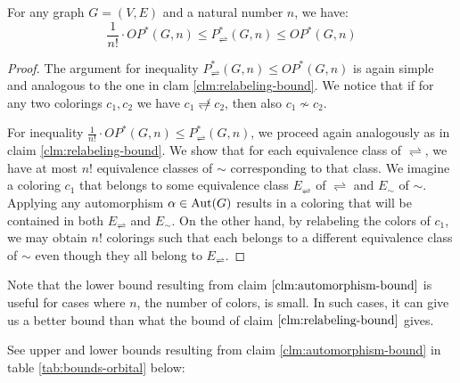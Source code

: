 \begin{claim}\label{clm:automorphism-bound}
    For any graph $G=(V,E)$ and a natural number $n$, we have: $$\frac{1}{n!} \cdot OP^*(G,n) \leq P^*_\rightleftharpoons(G,n) \leq OP^*(G,n)$$
\end{claim}

\begin{proof}

The argument for inequality $P^*_\rightleftharpoons(G,n) \leq OP^*(G,n)$ is again simple and analogous to the one in clam \ref{clm:relabeling-bound}. We notice that if for any two colorings $c_1,c_2$ we have $c_1 \not\rightleftharpoons c_2$, then also $c_1 \not\sim c_2$.

For inequality $\frac{1}{n!} \cdot OP^*(G,n) \leq P^*_\rightleftharpoons(G,n)$, we proceed again analogously as in claim \ref{clm:relabeling-bound}. We show that for each equivalence class of $\rightleftharpoons$, we have at most $n!$ equivalence classes of $\sim$ corresponding to that class. We imagine a coloring $c_1$ that belongs to some equivalence class $E_\rightleftharpoons$ of $\rightleftharpoons$ and $E_\sim$ of $\sim$. Applying any automorphism $\alpha \in \operatorname{Aut}(G)$ results in a coloring that will be contained in both $E_\rightleftharpoons$ and $E_\sim$. On the other hand, by relabeling the colors of $c_1$, we may obtain $n!$ colorings such that each belongs to a different equivalence class of $\sim$ even though they all belong to $E_\rightleftharpoons$.

\end{proof}

Note that the lower bound resulting from claim $\ref{clm:automorphism-bound}$ is useful for cases where $n$, the number of colors, is small. In such cases, it can give us a better bound than what the bound of claim $\ref{clm:relabeling-bound}$ gives.

See upper and lower bounds resulting from claim \ref{clm:automorphism-bound} in table \ref{tab:bounds-orbital} below:

